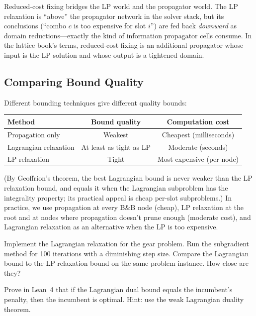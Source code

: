 \documentclass[11pt, a4paper, oneside]{book}
\begin{document}
\begin{crossrefbox}
Reduced-cost fixing bridges the LP world and the propagator world.  The LP
relaxation is ``above'' the propagator network in the solver stack, but its
conclusions (``combo $c$ is too expensive for slot $i$'') are fed back
\emph{downward} as domain reductions---exactly the kind of information
propagator cells consume.  In the lattice book's terms, reduced-cost fixing
is an additional propagator whose input is the LP solution and whose output
is a tightened domain.
\end{crossrefbox}

\subsection{Comparing Bound Quality}

Different bounding techniques give different quality bounds:

\begin{center}
\begin{tabular}{lcc}
\toprule
\textbf{Method} & \textbf{Bound quality} & \textbf{Computation cost} \\
\midrule
Propagation only & Weakest & Cheapest (milliseconds) \\
Lagrangian relaxation & At least as tight as LP & Moderate (seconds) \\
LP relaxation & Tight & Most expensive (per node) \\
\bottomrule
\end{tabular}
\end{center}

(By Geoffrion's theorem, the best Lagrangian bound is never weaker than the LP
relaxation bound, and equals it when the Lagrangian subproblem has the
integrality property; its practical appeal is cheap per-slot subproblems.)
In practice, we use propagation at every B\&B node (cheap), LP relaxation at
the root and at nodes where propagation doesn't prune enough (moderate cost),
and Lagrangian relaxation as an alternative when the LP is too expensive.

\begin{exercisebox}
Implement the Lagrangian relaxation for the gear problem.  Run the
subgradient method for 100 iterations with a diminishing step size.
Compare the Lagrangian bound to the LP relaxation bound on the same
problem instance.  How close are they?
\end{exercisebox}

\begin{exercisebox}
Prove in Lean~4 that if the Lagrangian dual bound equals the incumbent's
penalty, then the incumbent is optimal.  Hint: use the weak Lagrangian
duality theorem.
\end{exercisebox}
\end{document}
